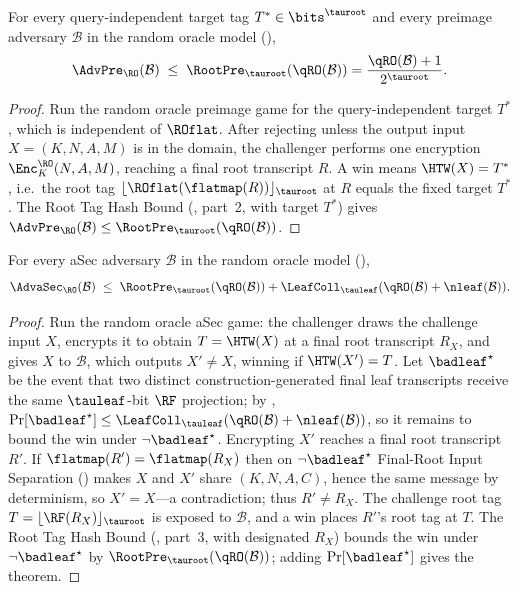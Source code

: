 \begin{theorem}
\label{thm:pre-ro}
For every query-independent target tag $T^* \in \bits^{\tauroot}$ and
every preimage adversary $\mathcal{B}$ in the \TW{}
random oracle model (),
\[
  \AdvPre_\RO(\mathcal{B})
  \;\leq\; \RootPre_{\tauroot}(\qRO(\mathcal{B}))
  = \frac{\qRO(\mathcal{B}) + 1}{2^{\tauroot}}.
\]
\end{theorem}

\begin{proof}
Run the random oracle preimage game for the query-independent target
$T^*$, which is independent of $\ROflat$. After rejecting unless the
output input $X = (K,N,A,M)$ is in the \TW{} domain, the challenger
performs one encryption $\Enc_{K}^\RO(N,A,M)$, reaching a final root
transcript $R$. A win means $\HTW(X) = T^*$, i.e.\ the root tag
$\lfloor \ROflat(\flatmap(R)) \rfloor_{\tauroot}$ at $R$ equals the fixed
target $T^*$. The Root Tag Hash Bound (, part~2,
with target $T^*$) gives
$\AdvPre_\RO(\mathcal{B}) \leq \RootPre_{\tauroot}(\qRO(\mathcal{B}))$.
\end{proof}

\begin{theorem}
\label{thm:asec-ro}
For every aSec adversary $\mathcal{B}$ in the \TW{} random oracle model
(),
\[
  \AdvaSec_\RO(\mathcal{B})
  \;\leq\;
  \RootPre_{\tauroot}(\qRO(\mathcal{B}))
  + \LeafColl_{\tauleaf}(\qRO(\mathcal{B})+\nleaf(\mathcal{B})).
\]
\end{theorem}

\begin{proof}
Run the random oracle aSec game: the challenger draws the challenge input
$X$, encrypts it to obtain $T = \HTW(X)$ at a final root transcript $R_X$,
and gives $X$ to $\mathcal{B}$, which outputs $X' \neq X$, winning if
$\HTW(X') = T$. Let $\badleaf^\star$ be the event that two distinct
construction-generated final leaf transcripts receive the same
$\tauleaf$-bit $\RF$ projection; by ,
$\Pr[\badleaf^\star] \leq \LeafColl_{\tauleaf}(\qRO(\mathcal{B})+\nleaf(\mathcal{B}))$,
so it remains to bound the win under $\neg\badleaf^\star$. Encrypting $X'$
reaches a final root transcript $R'$. If $\flatmap(R') = \flatmap(R_X)$
then on $\neg\badleaf^\star$ Final-Root Input Separation
() makes $X$ and $X'$ share $(K,N,A,C)$, hence
the same message by determinism, so $X' = X$---a contradiction; thus
$R' \neq R_X$. The challenge root tag
$T = \lfloor \RF(R_X) \rfloor_{\tauroot}$ is exposed to $\mathcal{B}$, and
a win places $R'$'s root tag at $T$. The Root Tag Hash Bound
(, part~3, with designated $R_X$) bounds the win
under $\neg\badleaf^\star$ by $\RootPre_{\tauroot}(\qRO(\mathcal{B}))$;
adding $\Pr[\badleaf^\star]$ gives the theorem.
\end{proof}
